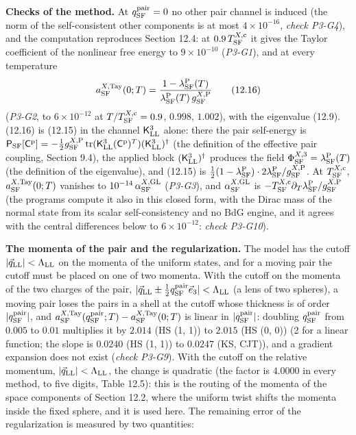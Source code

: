 \documentclass[
  10pt,
]{article}
\begin{document}
\textbf{Checks of the method.} At \(q^{\rm pair}_{\rm SF}=0\) no other
pair channel is induced (the norm of the self-consistent other
components is at most \(4\times10^{-16}\), \emph{check P3-G4}), and the
computation reproduces Section 12.4: at \(0.9\,T^{X,{\rm c}}_{\rm SF}\)
it gives the Taylor coefficient of the nonlinear free energy to
\(9\times10^{-10}\) (\emph{P3-G1}), and at every temperature
\[a^{X,{\rm Tay}}_{\rm SF}(0;T)=\frac{1-\lambda^{\rm P}_{\rm SF}(T)}{\lambda^{\rm P}_{\rm SF}(T)\,g^{X,{\rm P}}_{\rm SF}}\tag{12.16}\]
(\emph{P3-G2}, to \(6\times10^{-12}\) at
\(T/T^{X,{\rm c}}_{\rm SF}=0.9\), \(0.998\), \(1.002\)), with the
eigenvalue (12.9). (12.16) is (12.15) in the channel
\(\mathsf K^3_{\rm LL}\) alone: there the pair self-energy is
\(\mathsf P_{\rm SF}[\mathsf C^{\rm p}]=-\tfrac12g^{X,{\rm P}}_{\rm SF}\,\mathrm{tr}(\mathsf K^3_{\rm LL}(\mathsf C^{\rm p})^T)(\mathsf K^3_{\rm LL})^\dagger\)
(the definition of the effective pair coupling, Section 9.4), the
applied block \((\mathsf K^3_{\rm LL})^\dagger\) produces the field
\(\Phi^{X,3}_{\rm SF}=\lambda^{\rm P}_{\rm SF}(T)\) (the definition of
the eigenvalue), and (12.15) is
\(\tfrac12(1-\lambda^{\rm P}_{\rm SF})\cdot2\lambda^{\rm P}_{\rm SF}/g^{X,{\rm P}}_{\rm SF}\).
At \(T^{X,{\rm c}}_{\rm SF}\), \(a^{X,{\rm Tay}}_{\rm SF}(0;T)\)
vanishes to \(10^{-14}\,\alpha^{X,{\rm GL}}_{\rm SF}\) (\emph{P3-G3}),
and \(\alpha^{X,{\rm GL}}_{\rm SF}\) is
\(-T^{X,{\rm c}}_{\rm SF}\partial_T\lambda^{\rm P}_{\rm SF}/g^{X,{\rm P}}_{\rm SF}\)
(the programs compute it also in this closed form, with the Dirac mass
of the normal state from its scalar self-consistency and no BdG engine,
and it agrees with the central differences below to \(6\times10^{-12}\):
\emph{check P3-G10}).

\textbf{The momenta of the pair and the regularization.} The model has
the cutoff \(\lvert\vec q_{\rm LL}\rvert<\Lambda_{\rm LL}\) on the
momenta of the uniform states, and for a moving pair the cutoff must be
placed on one of two momenta. With the cutoff on the momenta of the two
charges of the pair,
\(\lvert\vec q_{\rm LL}\pm\tfrac12q^{\rm pair}_{\rm SF}\vec e_3\rvert<\Lambda_{\rm LL}\)
(a lens of two spheres), a moving pair loses the pairs in a shell at the
cutoff whose thickness is of order
\(\lvert q^{\rm pair}_{\rm SF}\rvert\), and
\(a^{X,{\rm Tay}}_{\rm SF}(q^{\rm pair}_{\rm SF};T)-a^{X,{\rm Tay}}_{\rm SF}(0;T)\)
is linear in \(\lvert q^{\rm pair}_{\rm SF}\rvert\): doubling
\(q^{\rm pair}_{\rm SF}\) from \(0.005\) to \(0.01\) multiplies it by
\(2.014\) (HS (1, 1)) to \(2.015\) (HS (0, 0)) (2 for a linear function;
the slope is \(0.0240\) (HS (1, 1)) to \(0.0247\) (KS, CJT)), and a
gradient expansion does not exist (\emph{check P3-G9}). With the cutoff
on the relative momentum,
\(\lvert\vec q_{\rm LL}\rvert<\Lambda_{\rm LL}\), the change is
quadratic (the factor is \(4.0000\) in every method, to five digits,
Table 12.5): this is the routing of the momenta of the space components
of Section 12.2, where the uniform twist shifts the momenta inside the
fixed sphere, and it is used here. The remaining error of the
regularization is measured by two quantities:
\end{document}

